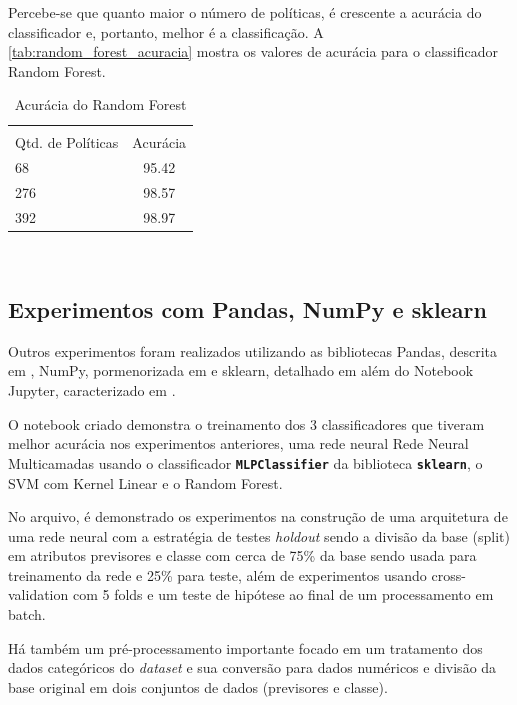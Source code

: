 Percebe-se que quanto maior o número de políticas, é crescente a acurácia do classificador e, portanto, melhor é a classificação. A \autoref{tab:random_forest_acuracia} mostra os valores de acurácia para o classificador Random Forest.

\begin{table}[h!]
	\centering
	\caption{Acurácia do Random Forest}
	\label{tab:random_forest_acuracia}
	\vspace{0.3cm}
	\begin{tabular}{p{6cm}c}
		\hline\\
		Qtd. de Políticas	& Acurácia  \\[10pt] 
		\hline
		68 					& 95.42    	\\
		276		     		& 98.57     \\
		392					& 98.97		\\
		\hline
	\end{tabular}
	\\[6pt]		
\end{table}

\subsection{Experimentos com Pandas, NumPy e sklearn}\label{exp:pandas-numpy-sklearn}
Outros experimentos foram realizados utilizando as bibliotecas Pandas, descrita em , NumPy, pormenorizada em  e sklearn, detalhado em  além do Notebook Jupyter, caracterizado em . 

O notebook criado demonstra o treinamento dos 3 classificadores que tiveram melhor acurácia nos experimentos anteriores, uma rede neural Rede Neural Multicamadas usando o classificador \texttt{\textbf{MLPClassifier}} da biblioteca \texttt{\textbf{sklearn}}, o SVM com Kernel Linear e o Random Forest.

No arquivo, é demonstrado os experimentos na construção de uma arquitetura de uma rede neural com a estratégia de testes \textit{holdout} sendo a divisão da base (split) em atributos previsores e classe com cerca de 75\% da base sendo usada para treinamento da rede e 25\% para teste, além de experimentos usando cross-validation com 5 folds e um teste de hipótese ao final de um processamento em batch.

Há também um pré-processamento importante focado em um tratamento dos dados categóricos do \textit{dataset} e sua conversão para dados numéricos e divisão da base original em dois conjuntos de dados (previsores e classe).

